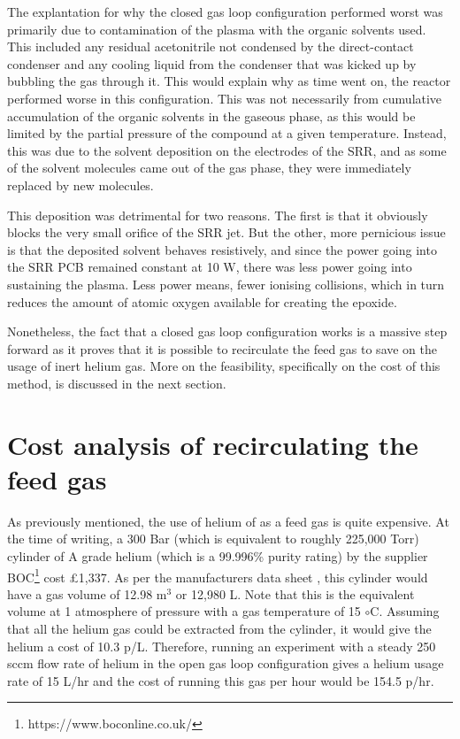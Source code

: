 The explantation for why the closed gas loop configuration performed worst was primarily due to contamination of the plasma with the organic solvents used. This included any residual acetonitrile not condensed by the direct-contact condenser and any cooling liquid from the condenser that was kicked up by bubbling the gas through it. This would explain why as time went on, the reactor performed worse in this configuration. This was not necessarily from cumulative accumulation of the organic solvents in the gaseous phase, as this would be limited by the partial pressure of the compound at a given temperature. Instead, this was due to the solvent deposition on the electrodes of the SRR, and as some of the solvent molecules came out of the gas phase, they were immediately replaced by new molecules. 

This deposition was detrimental for two reasons. The first is that it obviously blocks the very small orifice of the SRR jet. But the other, more pernicious issue is that the deposited solvent behaves resistively, and since the power going into the SRR PCB remained constant at 10 W, there was less power going into sustaining the plasma. Less power means, fewer ionising collisions, which in turn reduces the amount of atomic oxygen available for creating the epoxide.

Nonetheless, the fact that a closed gas loop configuration works is a massive step forward as it proves that it is possible to recirculate the feed gas to save on the usage of inert helium gas. More on the feasibility, specifically on the cost of this method, is discussed in the next section.

\section{Cost analysis of recirculating the feed gas}

As previously mentioned, the use of helium of as a feed gas is quite expensive. At the time of writing, a 300 Bar (which is equivalent to roughly 225,000 Torr) cylinder of A grade helium (which is a 99.996\% purity rating) by the supplier BOC\footnote{https://www.boconline.co.uk/} cost £1,337. As per the manufacturers data sheet \cite{bocHeliumDS}, this cylinder would have a gas volume of 12.98 m$^3$ or 12,980 L. Note that this is the equivalent volume at 1 atmosphere of pressure with a gas temperature of 15 $\circ$C. Assuming that all the helium gas could be extracted from the cylinder, it would give the helium a cost of 10.3 p/L. Therefore, running an experiment with a steady 250 sccm flow rate of helium in the open gas loop configuration gives a helium usage rate of 15 L/hr and the cost of running this gas per hour would be 154.5 p/hr. 

